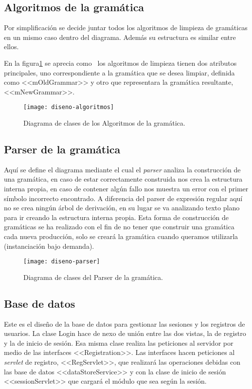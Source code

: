 \subsection{Algoritmos de la gramática}

Por simplificación se decide juntar todos los algoritmos de limpieza de gramáticas en un mismo caso dentro del diagrama. Además su estructura es similar entre ellos.

En la figura\ref{fig:4.3} se aprecia como ~los algoritmos de limpieza tienen dos atributos principales, uno correspondiente a la gramática que se desea limpiar, definida como <<mOldGrammar>> y otro que representara la gramática resultante, <<mNewGrammar>>.

\begin{figure}[h]
\centering
\texttt{[image: diseno-algoritmos]}
\caption{Diagrama de clases de los Algoritmos de la gramática\cite{thothv2}.}
\label{fig:4.3}
\end{figure}

\subsection{Parser de la gramática}

Aquí se define el diagrama mediante el cual el \emph{parser} analiza la construcción de una gramática, en caso de estar correctamente construida nos crea la estructura interna propia, en caso de contener algún fallo nos muestra un error con el primer símbolo incorrecto encontrado.
A diferencia del parser de expresión regular aquí no se crea ningún árbol de
derivación, en su lugar se va analizando texto plano para ir creando la estructura interna propia.
Esta forma de construcción de gramáticas se ha realizado con el fin de no tener que construir una gramática cada nueva producción, solo se creará la gramática cuando queramos utilizarla (instanciación bajo demanda).

\begin{figure}[h]
\centering
\texttt{[image: diseno-parser]}
\caption{Diagrama de clases del Parser de la gramática\cite{thothv2}.}
\label{fig:4.4}
\end{figure}



\subsection{Base de datos}

Este es el diseño de la base de datos para gestionar las sesiones y los registros de usuarios. La clase Login hace de nexo de unión entre las dos vistas, la de registro y la de inicio de sesión. Esa misma clase realiza las peticiones al servidor por medio de las interfaces <<Registration>>. Las interfaces hacen peticiones al \emph{servlet} de registro, <<RegServlet>>, que realizará las operaciones debidas con las base de datos <<dataStoreService>> y con la clase de inicio de sesión <<sessionServlet>> que cargará el módulo que sea según la sesión.

